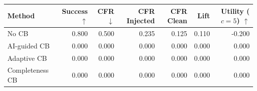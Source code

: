 \begin{tabular}{lrrrrrr}
\toprule
Method & Success $\uparrow$ & CFR $\downarrow$ & CFR Injected & CFR Clean & Lift & Utility ($c=5$) $\uparrow$ \\
\midrule
No CB & 0.800 & 0.500 & 0.235 & 0.125 & 0.110 & -0.200 \\
AI-guided CB & 0.000 & 0.000 & 0.000 & 0.000 & 0.000 & 0.000 \\
Adaptive CB & 0.000 & 0.000 & 0.000 & 0.000 & 0.000 & 0.000 \\
Completeness CB & 0.000 & 0.000 & 0.000 & 0.000 & 0.000 & 0.000 \\
\bottomrule
\end{tabular}
